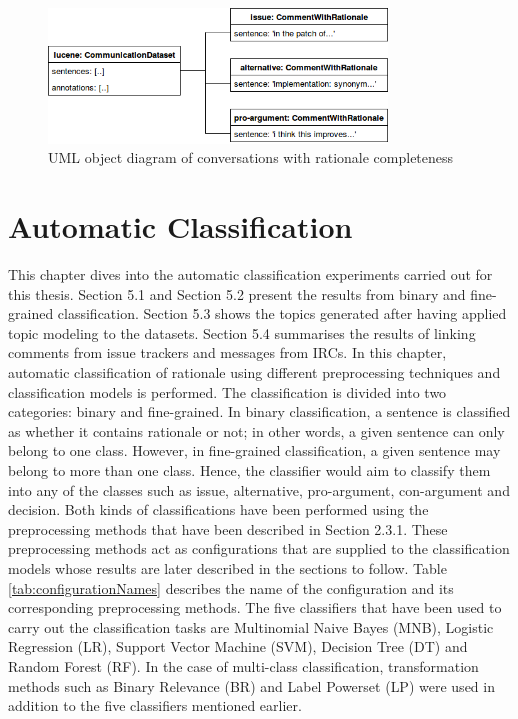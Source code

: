 \documentclass[a4paper,12pt,twoside]{report}
\begin{document}
\begin{figure}[h] %
    \centering
    \includegraphics[width=9cm]{rationale-incomplete}
    \caption{UML object diagram of conversations with rationale completeness}
    \label{fig:rationaleInComplete}
\end{figure}


\chapter{Automatic Classification}
This chapter dives into the automatic classification experiments carried out for this thesis. Section 5.1 and Section 5.2 present the results from binary and fine-grained classification. Section 5.3 shows the topics generated after having applied topic modeling to the datasets. Section 5.4 summarises the results of linking comments from issue trackers and messages from \acs{IRC}s.
\newline \newline
In this chapter, automatic classification of rationale using different preprocessing techniques and classification models is performed. The classification is divided into two categories: binary and fine-grained. In binary classification, a sentence is classified as whether it contains rationale or not; in other words, a given sentence can only belong to one class. However, in fine-grained classification, a given sentence may belong to more than one class. Hence, the classifier would aim to classify them into any of the classes such as issue, alternative, pro-argument, con-argument and decision. Both kinds of classifications have been performed using the preprocessing methods that have been described in Section 2.3.1. These preprocessing methods act as configurations that are supplied to the classification models whose results are later described in the sections to follow. Table \ref{tab:configurationNames} describes the name of the configuration and its corresponding preprocessing methods. The five classifiers that have been used to carry out the classification tasks are Multinomial Naive Bayes (\acs{MNB}), Logistic Regression (\acs{LR}), Support Vector Machine (\acs{SVM}), Decision Tree (\acs{DT}) and Random Forest (\acs{RF}). In the case of multi-class classification, transformation methods such as Binary Relevance (\acs{BR}) and Label Powerset (\acs{LP}) were used in addition to the five classifiers mentioned earlier. 
\end{document}
